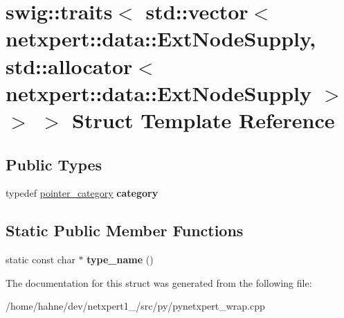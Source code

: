 \hypertarget{structswig_1_1traits_3_01std_1_1vector_3_01netxpert_1_1data_1_1ExtNodeSupply_00_01std_1_1allocat490938631b4088717dfb7247c42cbd65}{}\section{swig\+:\+:traits$<$ std\+:\+:vector$<$ netxpert\+:\+:data\+:\+:Ext\+Node\+Supply, std\+:\+:allocator$<$ netxpert\+:\+:data\+:\+:Ext\+Node\+Supply $>$ $>$ $>$ Struct Template Reference}
\label{structswig_1_1traits_3_01std_1_1vector_3_01netxpert_1_1data_1_1ExtNodeSupply_00_01std_1_1allocat490938631b4088717dfb7247c42cbd65}
\subsection*{Public Types}
\begin{DoxyCompactItemize}
\item 
typedef \hyperlink{structswig_1_1pointer__category}{pointer\+\_\+category} {\bfseries category}\hypertarget{structswig_1_1traits_3_01std_1_1vector_3_01netxpert_1_1data_1_1ExtNodeSupply_00_01std_1_1allocat490938631b4088717dfb7247c42cbd65_a09df6fc08f5ea93ce7a8a4886b840092}{}\label{structswig_1_1traits_3_01std_1_1vector_3_01netxpert_1_1data_1_1ExtNodeSupply_00_01std_1_1allocat490938631b4088717dfb7247c42cbd65_a09df6fc08f5ea93ce7a8a4886b840092}

\end{DoxyCompactItemize}
\subsection*{Static Public Member Functions}
\begin{DoxyCompactItemize}
\item 
static const char $\ast$ {\bfseries type\+\_\+name} ()\hypertarget{structswig_1_1traits_3_01std_1_1vector_3_01netxpert_1_1data_1_1ExtNodeSupply_00_01std_1_1allocat490938631b4088717dfb7247c42cbd65_a245eca711d44fe08035eb6408b6a0e07}{}\label{structswig_1_1traits_3_01std_1_1vector_3_01netxpert_1_1data_1_1ExtNodeSupply_00_01std_1_1allocat490938631b4088717dfb7247c42cbd65_a245eca711d44fe08035eb6408b6a0e07}

\end{DoxyCompactItemize}


The documentation for this struct was generated from the following file\+:\begin{DoxyCompactItemize}
\item 
/home/hahne/dev/netxpert1\+\_/src/py/pynetxpert\+\_\+wrap.\+cpp\end{DoxyCompactItemize}
